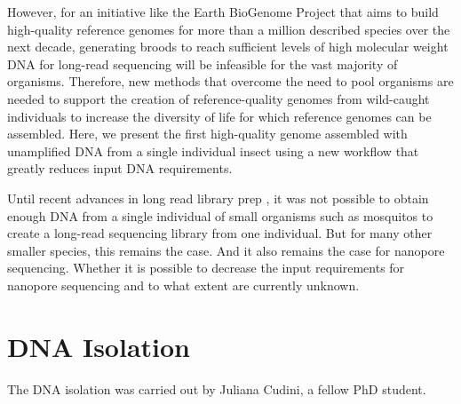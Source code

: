 However, for an initiative like the Earth BioGenome Project \cite{Lewin2018-lc}  that aims to build high-quality reference genomes for more than a million described species over the next decade, generating broods to reach sufficient levels of high molecular weight DNA for long-read sequencing will be infeasible for the vast majority of organisms. Therefore, new methods that overcome the need to pool organisms are needed to support the creation of reference-quality genomes from wild-caught individuals to increase the diversity of life for which reference genomes can be assembled. Here, we present the first high-quality genome assembled with unamplified DNA from a single individual insect using a new workflow that greatly reduces input DNA requirements.

Until recent advances in long read library prep \cite{mosquito_assembly}, it was not possible to obtain
enough DNA from a single individual of small organisms such as mosquitos to create a long-read sequencing library from one individual. 
But for many other smaller species, this remains the case. And it also remains the case for nanopore sequencing. 
Whether it is possible to decrease the input requirements for nanopore sequencing and to what extent are currently unknown.  


\section{DNA Isolation}

The DNA isolation was carried out by Juliana Cudini, a fellow PhD student. 

